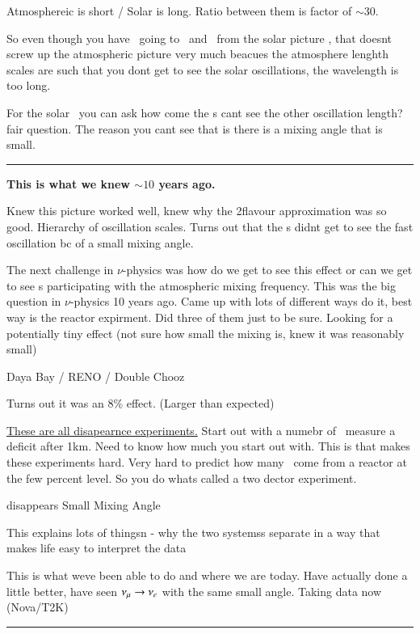 {Atmosphereic is short / Solar is long. 
Ratio between them is factor of $\sim$30.

So even though you have \nue\ going to \numu\ and \nutau\ from the solar picture , that doesnt screw up the atmospheric picture very much beacues the atmosphere lenghth scales are such that you dont get to see the solar oscillations, the wavelength is too long. 

For the solar \nus\ you can ask how come the \nue s cant see the other oscillation length? fair question. 
The reason you cant see that is there is a mixing angle that is small. 

\noindent\rule{\textwidth}{1pt}

\textbf{This is what we knew $\sim 10$ years ago.}

Knew this picture worked well, knew why the 2flavour approximation was so good. 
Hierarchy of oscillation scales. 
Turns out that the \nue s didnt get to see the fast oscillation bc of a small mixing angle. 

The next challenge in $\nu$-physics was how do we get to see this effect or can we get to see \nue s participating with the atmospheric mixing frequency. 
This was the big question in $\nu$-physics 10 years ago.
Came up with lots of different ways do it, best way is the reactor expirment. 
Did three of them just to be sure. 
Looking for a potentially tiny effect (not sure how small the mixing is, knew it was reasonably small) 

\bc
Daya Bay / 
RENO  /
Double Chooz
\ec

Turns out it was an 8\% effect. (Larger than expected)

\underline{These are all disapearnce experiments.}
Start out with a numebr of \nus\ measure a deficit after 1km. 
Need to know how much you start out with. 
This is that makes these experiments hard.
Very hard to predict how many \nus\ come from a reactor at the few percent level. 
So you do whats called a two dector experiment. 

\be
\nue \rightarrow \textrm{ disappears }
\ee
\bc
Small Mixing Angle
\ec

This explains lots of thingsn
- why the two systemss separate in a way that makes life easy to interpret the data

This is what weve been able to do and where we are today. 
Have actually done a little better, have seen $\nu_\mu \rightarrow \nu_e$ with the same small angle. Taking data now (Nova/T2K)


\noindent\rule{\textwidth}{1pt}

}
